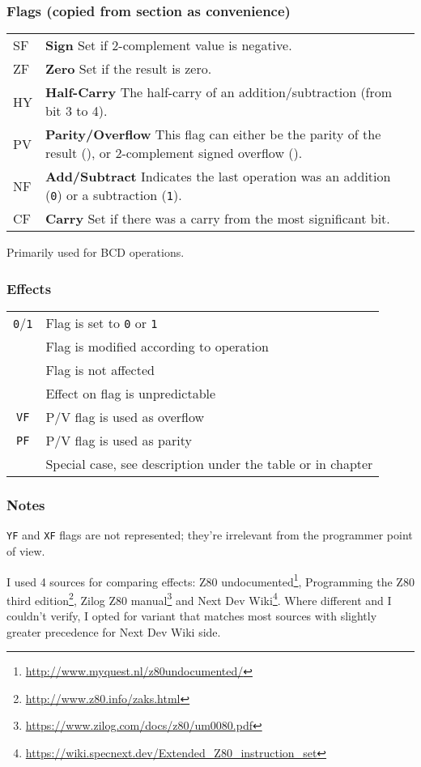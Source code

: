 \subsubsection{Flags \textnormal{(copied from section  as convenience)}}

\begin{tabularx}{\linewidth}{lX}
	SF & 
		\textbf{Sign} Set if 2-complement value is negative.\\
	ZF\notet & 
		\textbf{Zero} Set if the result is zero. \\
	HY\notet & 
		\textbf{Half-Carry} The half-carry of an addition/subtraction (from bit 3 to 4)\See{*}. \\
	PV\notet & 
		\textbf{Parity/Overflow} This flag can either be the parity of the result ({\tt \FPP}), or 2-complement signed overflow ({\tt \FPV}). \\
	NF\notet & 
		\textbf{Add/Subtract} Indicates the last operation was an addition ({\tt 0}) or a subtraction ({\tt 1})\See{*}. \\
	CF\notet & 
		\textbf{Carry} Set if there was a carry from the most significant bit. \\
\end{tabularx}

\See{*} \small{Primarily used for BCD operations.}


\subsubsection{Effects}

\begin{tabular}{cl}
	{\tt 0}/{\tt 1} & Flag is set to {\tt 0} or {\tt 1} \\
	{\tt \FS} & Flag is modified according to operation \\
	{\tt \FN} & Flag is not affected \\
	{\tt \FU} & Effect on flag is unpredictable \\
	{\tt VF} & P/V flag is used as overflow \\
	{\tt PF} & P/V flag is used as parity \\
	{\tt \FX} & Special case, see description under the table or in chapter \XRef{instruction_details}
\end{tabular}

\subsubsection{Notes}

{\tt YF} and {\tt XF} flags are not represented; they're irrelevant from the programmer point of view.
	
I used 4 sources for comparing effects: Z80 undocumented\footnote{\url{http://www.myquest.nl/z80undocumented/}}, Programming the Z80 third edition\footnote{\url{http://www.z80.info/zaks.html}}, Zilog Z80 manual\footnote{\url{https://www.zilog.com/docs/z80/um0080.pdf}} and Next Dev Wiki\footnote{\url{https://wiki.specnext.dev/Extended_Z80_instruction_set}}. Where different and I couldn't verify, I opted for variant that matches most sources with slightly greater precedence for Next Dev Wiki side.


\pagebreak
